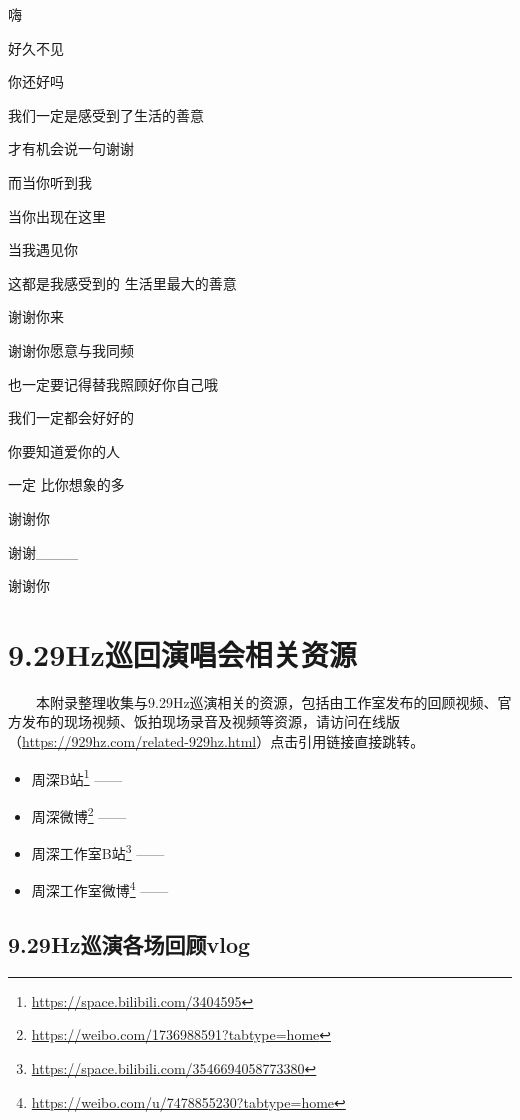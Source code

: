 \documentclass[]{ctexbook}
\providecommand{\tightlist}{%
  \setlength{\itemsep}{0pt}\setlength{\parskip}{0pt}}
\renewcommand{\href}[2]{#2\footnote{\url{#1}}}
\begin{document}
嗨

好久不见

你还好吗

我们一定是感受到了生活的善意

才有机会说一句谢谢

而当你听到我

当你出现在这里

当我遇见你

这都是我感受到的 生活里最大的善意

谢谢你来

谢谢你愿意与我同频

也一定要记得替我照顾好你自己哦

我们一定都会好好的

你要知道爱你的人

一定 比你想象的多

谢谢你

谢谢\_\_\_\_

谢谢你

\chapter{9.29Hz巡回演唱会相关资源}\label{related-929hz}

  本附录整理收集与9.29Hz巡演相关的资源，包括由工作室发布的回顾视频、官方发布的现场视频、饭拍现场录音及视频等资源，请访问在线版（\url{https://929hz.com/related-929hz.html}）点击引用链接直接跳转。

\begin{itemize}
\tightlist
\item
  \href{https://space.bilibili.com/3404595}{周深B站} ------ \citet{bili-charlie}\\
\item
  \href{https://weibo.com/1736988591?tabtype=home}{周深微博} ------ \citet{weibo-charlie}\\
\item
  \href{https://space.bilibili.com/3546694058773380}{周深工作室B站} ------ \citet{bili-charlie-studio}\\
\item
  \href{https://weibo.com/u/7478855230?tabtype=home}{周深工作室微博} ------ \citet{weibo-charlie-studio}
\end{itemize}

\section{9.29Hz巡演各场回顾vlog}\label{review-vlog}
\end{document}
